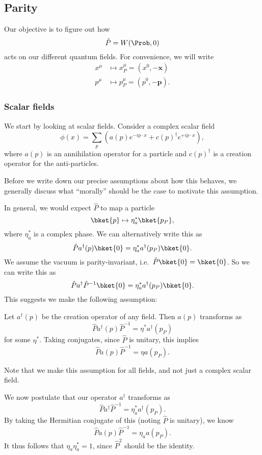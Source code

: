 \documentclass[a4paper]{article}
\begin{document}
\subsection{Parity}
Our objective is to figure out how
\[
  \hat{P} = W(\Prob, 0)
\]
acts on our different quantum fields. For convenience, we will write
\begin{align*}
  x^\mu &\mapsto x^\mu_P = (x^0, -\mathbf{x})\\
  p^\mu &\mapsto p^\mu_P = (p^0, -\mathbf{p}).
\end{align*}

\subsubsection*{Scalar fields}
We start by looking at scalar fields. Consider a complex scalar field
\[
  \phi(x) = \sum_p \left(a(p) e^{-ip\cdot x} + c(p)^\dagger e^{+i p\cdot x}\right),
\]
where $a(p)$ is an annihilation operator for a particle and $c(p)^\dagger$ is a creation operator for the anti-particles.

Before we write down our precise assumptions about how this behaves, we generally discuss what ``morally'' should be the case to motivate this assumption.

In general, we would expect $\hat{P}$ to map a particle
\[
  \bket{p} \mapsto \eta^*_a\bket{p_P},
\]
where $\eta^*_a$ is a complex phase. We can alternatively write this as
\[
  \hat{P}a^\dagger(p) \bket{0} = \eta_a^* a^\dagger(p_P)\bket{0}.
\]
We assume the vacuum is parity-invariant, i.e.\ $\hat{P}\bket{0} = \bket{0}$. So we can write this as
\[
  \hat{P}a^\dagger \hat{P}^{-1}\bket{0} = \eta_a^* a^\dagger(p_P) \bket{0}.
\]
This suggests we make the following assumption:
\begin{assumption}
  Let $a^\dagger(p)$ be the creation operator of any field. Then $a(p)$ transforms as
  \[
    \hat{P} a^\dagger (p) \hat{P}^{-1} = \eta^* a^\dagger(p_P)
  \]
  for some $\eta^*$. Taking conjugates, since $\hat{P}$ is unitary, this implies
  \[
    \hat{P} a(p) \hat{P}^{-1} = \eta a(p_P).
  \]
\end{assumption}
Note that we make this assumption for all fields, and not just a complex scalar field.

We now postulate that our operator $a^\dagger$ transforms as
\[
  \hat{P}a^\dagger \hat{P}^{-1} = \eta_a^* a^\dagger(p_P).
\]
By taking the Hermitian conjugate of this (noting $\hat{P}$ is unitary), we know
\[
  \hat{P} a(p) \hat{P}^{-1} = \eta_a a(p_P).
\]
It thus follows that $\eta_a \eta_a^* = 1$, since $\hat{P}^2$ should be the identity.
\end{document}
